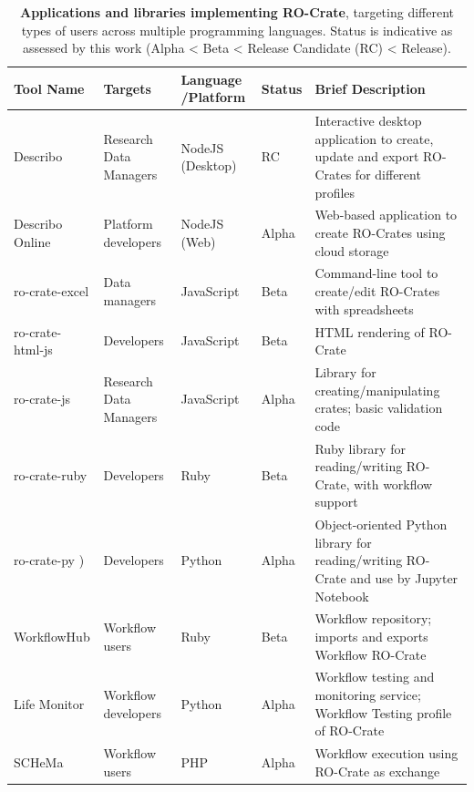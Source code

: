 \small
\begin{longtable}[]{@{}
>{\raggedright\arraybackslash}p{}
>{\raggedright\arraybackslash}p{}
>{\raggedright\arraybackslash}p{}
>{\raggedright\arraybackslash}p{}
>{\raggedright\arraybackslash}p{}@{}}
\caption[Applications and libraries implementing RO-Crate]{{\bf Applications and libraries implementing RO-Crate}, targeting
  different types of users across multiple programming languages. Status
  is indicative as assessed by this work (Alpha \textless{} Beta
  \textless{} Release Candidate (RC) \textless{} Release).
}
\label{ch5:tab1}\tabularnewline
\toprule
Tool Name & Targets & Language /Platform & Status & Brief Description \\
\midrule
\endhead
Describo \cite{ch5-78} &
Research Data Managers & NodeJS (Desktop) & RC & Interactive desktop
application to create, update and export RO-Crates for different
profiles \\
Describo Online
\cite{ch5-77} &
Platform developers & NodeJS (Web) & Alpha & Web-based application to
create RO-Crates using cloud storage \\
ro-crate-excel
\cite{ch5-84} & Data
managers & JavaScript & Beta & Command-line tool to create/edit
RO-Crates with spreadsheets \\
ro-crate-html-js
\cite{ch5-95} &
Developers & JavaScript & Beta & HTML rendering of RO-Crate \\
ro-crate-js
\cite{ch5-49} & Research
Data Managers & JavaScript & Alpha & Library for creating/manipulating
crates; basic validation code \\
ro-crate-ruby
\cite{Bacall 2022b} &
Developers & Ruby & Beta & Ruby library for reading/writing RO-Crate,
with workflow support \\
ro-crate-py \cite{ro-crate-py}) &
Developers & Python & Alpha & Object-oriented Python library for
reading/writing RO-Crate and use by Jupyter Notebook \\
WorkflowHub \cite{ch5-124} & Workflow
users & Ruby & Beta & Workflow repository; imports and exports Workflow
RO-Crate \\
Life Monitor \cite{CRS4 2022} & Workflow
developers & Python & Alpha & Workflow testing and monitoring service;
Workflow Testing profile of RO-Crate \\
SCHeMa \cite{ch5-118} & Workflow
users & PHP & Alpha & Workflow execution using RO-Crate as exchange

\end{longtable}
